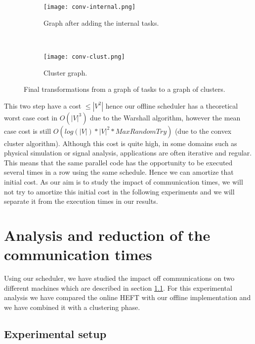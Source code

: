 \documentclass[10pt, conference, compsocconf,pdftex,dvipsnames]{IEEEtran}
\begin{document}
\begin{figure}[t!]
    \centering
    \begin{subfigure}{0.24\textwidth}
        \centering
        \texttt{[image: conv-internal.png]}
        \caption{Graph after adding the internal tasks.}
        \label{fig:conv-int}
    \end{subfigure}
    ~
    \begin{subfigure}{0.1\textwidth}
        \centering
        \texttt{[image: conv-clust.png]}
        \caption{Cluster graph.}
        \label{fig:conv-clust}
    \end{subfigure}
    \caption{Final transformations from a graph of tasks to a graph of
    clusters.}
    \label{fig:conv-end}
\end{figure}

This two step have a cost $\leq |V^2|$ hence our offline scheduler has a
theoretical worst case cost in $O(|V|^3)$ due to the Warshall algorithm,
however the mean case cost is still $O(log(|V|)*|V|^2*MaxRandomTry)$ (due to
the convex cluster algorithm).  Although this cost is quite high, in some
domains such as physical simulation or signal analysis, applications are often
iterative and regular. This means that the same parallel code has the
opportunity to be executed several times in a row using the same schedule.
Hence we can amortize that initial cost. As our aim is to study the impact of
communication times, we will not try to amortize this initial cost in the
following experiments and we will separate it from the execution times in our
results.

\section{Analysis and reduction of the communication times}
\label{sec:exp}
Using our scheduler, we have studied the impact off communications on two
different machines which are described in section \ref{sec:exp-set}. For this
experimental analysis we have compared the online HEFT with our offline
implementation and we have combined it with a clustering phase.

\subsection{Experimental setup}
\label{sec:exp-set}
\end{document}
